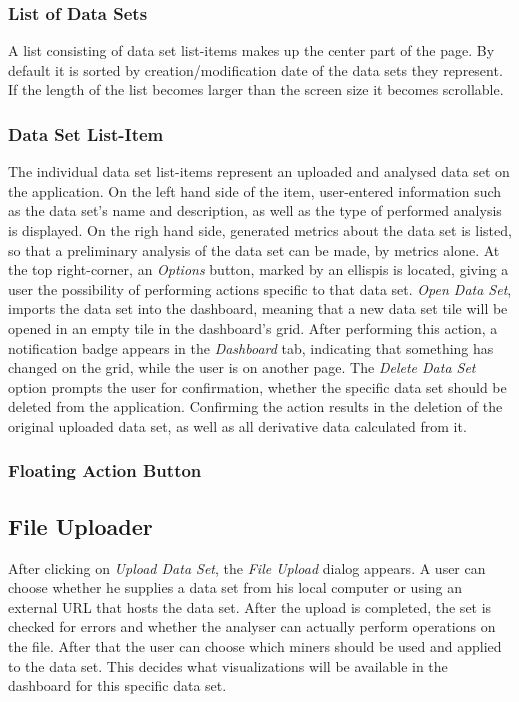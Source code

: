 \subsubsection{List of Data Sets}
A list consisting of  data set list-items makes up the center part of the page. By default it is sorted by creation/modification date of the data sets they represent. If the length of the list becomes larger than the screen size it becomes scrollable.
\subsubsection{Data Set List-Item}
The individual data set list-items represent an uploaded and analysed data set on the application. On the left hand side of the item, user-entered information such as the data set's name and description, as well as the type of performed analysis is displayed. On the righ hand side, generated metrics about the data set is listed, so that a preliminary analysis of the data set can be made, by metrics alone. At the top right-corner, an \emph{Options} button, marked by an ellispis is located, giving a user the possibility of performing actions specific to that data set. \emph{Open Data Set}, imports the data set into the dashboard, meaning that a new data set tile will be opened in an empty tile in the dashboard's grid. After performing this action, a notification badge appears in the \emph{Dashboard} tab, indicating that something has changed on the grid, while the user is on another page. The \emph{Delete Data Set} option prompts the user for confirmation, whether the specific data set should be deleted from the application. Confirming the action results in the deletion of the original uploaded data set, as well as all derivative data calculated from it.
\subsubsection{Floating Action Button}

\subsection{File Uploader}
After clicking on \emph{Upload Data Set}, the \emph{File Upload} dialog appears. A user can choose whether he supplies a data set from his local computer or using an external URL that hosts the data set. After the upload is completed, the set is checked for errors and whether the analyser can actually perform operations on the file. After that the user can choose which miners should be used and applied to the data set. This decides what visualizations will be available in the dashboard for this specific data set. 
